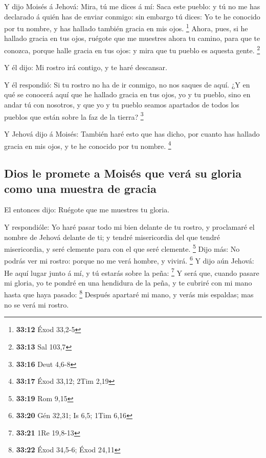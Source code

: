  Y dijo Moisés á Jehová: Mira, tú me dices á mí: Saca este
pueblo: y tú no me has declarado á quién has de enviar conmigo: sin
embargo tú dices: Yo te he conocido por tu nombre, y has hallado también
gracia en mis ojos. \footnote{\textbf{33:12} Éxod 33,2-5} 
Ahora, pues, si he hallado gracia en tus ojos, ruégote que me muestres
ahora tu camino, para que te conozca, porque halle gracia en tus ojos: y
mira que tu pueblo es aquesta gente. \footnote{\textbf{33:13} Sal 103,7}

 Y él dijo: Mi rostro irá contigo, y te haré descansar.

 Y él respondió: Si tu rostro no ha de ir conmigo, no nos
saques de aquí.  ¿Y en qué se conocerá aquí que he hallado
gracia en tus ojos, yo y tu pueblo, sino en andar tú con nosotros, y que
yo y tu pueblo seamos apartados de todos los pueblos que están sobre la
faz de la tierra? \footnote{\textbf{33:16} Deut 4,6-8}

 Y Jehová dijo á Moisés: También haré esto que has dicho,
por cuanto has hallado gracia en mis ojos, y te he conocido por tu
nombre. \footnote{\textbf{33:17} Éxod 33,12; 2Tim 2,19}

\hypertarget{dios-le-promete-a-moisuxe9s-que-veruxe1-su-gloria-como-una-muestra-de-gracia}{%
\subsection{Dios le promete a Moisés que verá su gloria como una muestra
de
gracia}\label{dios-le-promete-a-moisuxe9s-que-veruxe1-su-gloria-como-una-muestra-de-gracia}}

 El entonces dijo: Ruégote que me muestres tu gloria.

 Y respondióle: Yo haré pasar todo mi bien delante de tu
rostro, y proclamaré el nombre de Jehová delante de ti; y tendré
misericordia del que tendré misericordia, y seré clemente para con el
que seré clemente. \footnote{\textbf{33:19} Rom 9,15}  Dijo
más: No podrás ver mi rostro: porque no me verá hombre, y vivirá.
\footnote{\textbf{33:20} Gén 32,31; Is 6,5; 1Tim 6,16}  Y
dijo aún Jehová: He aquí lugar junto á mí, y tú estarás sobre la peña:
\footnote{\textbf{33:21} 1Re 19,8-13}  Y será que, cuando
pasare mi gloria, yo te pondré en una hendidura de la peña, y te cubriré
con mi mano hasta que haya pasado: \footnote{\textbf{33:22} Éxod 34,5-6;
  Éxod 24,11}  Después apartaré mi mano, y verás mis
espaldas; mas no se verá mi rostro.

